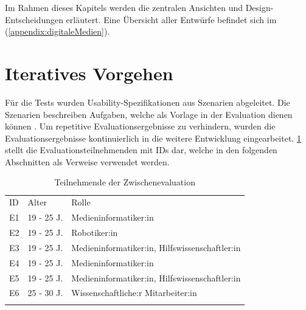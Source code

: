 Im Rahmen dieses Kapitels werden die zentralen Ansichten und
Design-Entscheidungen erläutert. Eine Übersicht aller Entwürfe befindet sich im
(\ref{appendix:digitaleMedien}).

\section{Iteratives Vorgehen}
Für die Tests wurden Usability-Spezifikationen aus Szenarien abgeleitet. Die
Szenarien beschreiben Aufgaben, welche als Vorlage in der Evaluation dienen
können . Um repetitive
Evaluationsergebnisse zu verhindern, wurden die Evaluationsergebnisse
kontinuierlich in die weitere Entwicklung eingearbeitet. \ref{table:e} stellt
die Evaluationsteilnehmenden mit IDs dar, welche in den folgenden Abschnitten
als Verweise verwendet werden.

\begin{table}[h]
    \centering
    \caption{Teilnehmende der Zwischenevaluation}
    \begin{tabular}{lll}
        \arrayrulecolor{maincolor}\hline
        \sffamily\color{maincolor}ID & \sffamily\color{maincolor}Alter &
        \sffamily\color{maincolor}Rolle
        \\
        \arrayrulecolor{maincolor}\hline
        E1                           & 19 - 25 J.                      &
        Medieninformatiker:in
        \\
        E2                           & 19 - 25 J.                      &
        Robotiker:in                                                     \\
        E3                           & 19 - 25 J.                      &
        Medieninformatiker:in, Hilfswissenschaftler:in                   \\
        E4                           & 19 - 25 J.                      &
        Medieninformatiker:in                                            \\
        E5                           & 19 - 25 J.                      &
        Medieninformatiker:in, Hilfswissenschaftler:in
        \\
        E6                           & 25 - 30 J.                      &
        Wissenschaftliche:r Mitarbeiter:in                               \\
        \arrayrulecolor{maincolor}\hline
    \end{tabular}
    \label{table:e}
\end{table}

